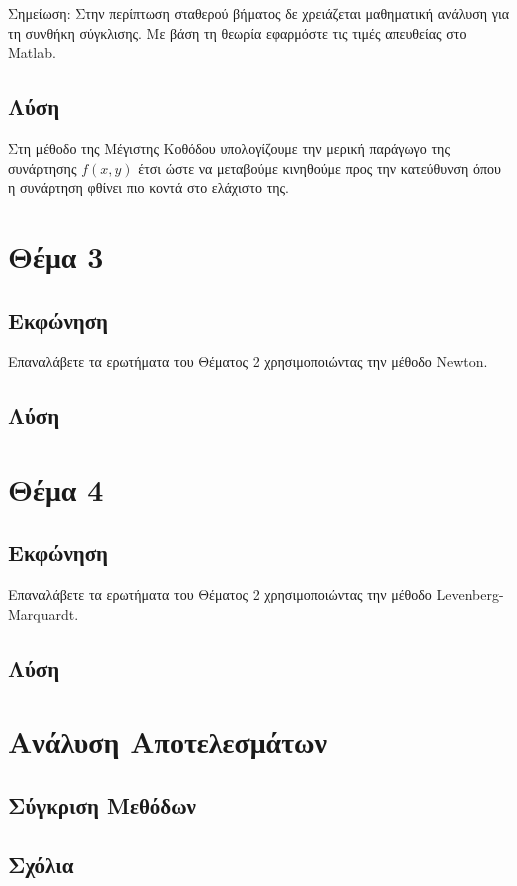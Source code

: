 \documentclass{report}
\begin{document}
Σημείωση: Στην περίπτωση σταθερού βήματος δε χρειάζεται μαθηματική ανάλυση για τη συνθήκη σύγκλισης. 
Με βάση τη θεωρία εφαρμόστε τις τιμές απευθείας στο Matlab.
\section{Λύση}
Στη μέθοδο της Μέγιστης Κοθόδου υπολογίζουμε την μερική παράγωγο της συνάρτησης $f(x,y)$
έτσι ώστε να μεταβούμε κινηθούμε προς την κατεύθυνση όπου η συνάρτηση φθίνει πιο κοντά στο
ελάχιστο της.

\chapter{Θέμα 3}
\section{Εκφώνηση}
Επαναλάβετε τα ερωτήματα του Θέματος 2 χρησιμοποιώντας την μέθοδο 
Newton.
\section{Λύση}


\chapter{Θέμα 4}
\section{Εκφώνηση}
Επαναλάβετε τα ερωτήματα του Θέματος 2 χρησιμοποιώντας την μέθοδο 
Levenberg-Marquardt.
\section{Λύση}


\chapter{Ανάλυση Αποτελεσμάτων}
\section{Σύγκριση Μεθόδων}

\section{Σχόλια}


\nocite{*} %


\end{document}
